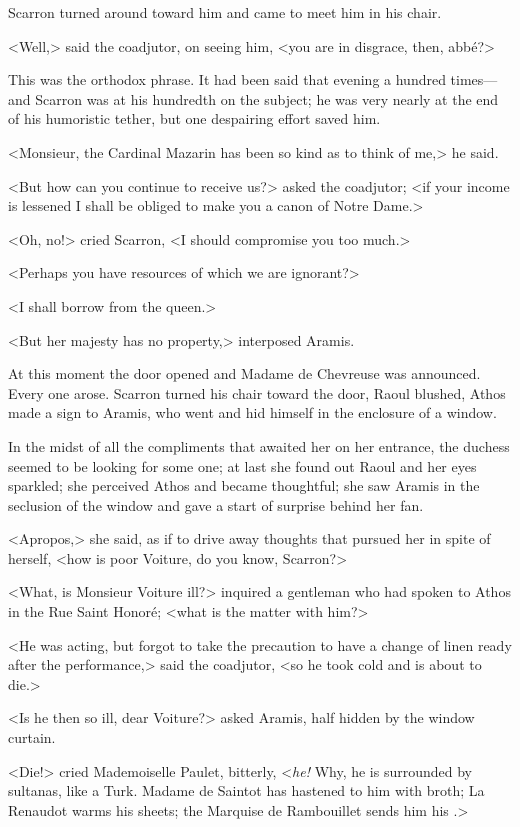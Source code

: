 Scarron turned around toward him and came to meet him in his chair.

<Well,> said the coadjutor, on seeing him, <you are in disgrace, then, abbé?>

This was the orthodox phrase. It had been said that evening a hundred times—and Scarron was at his hundredth  on the subject; he was very nearly at the end of his humoristic tether, but one despairing effort saved him.

<Monsieur, the Cardinal Mazarin has been so kind as to think of me,> he said.

<But how can you continue to receive us?> asked the coadjutor; <if your income is lessened I shall be obliged to make you a canon of Notre Dame.>

<Oh, no!> cried Scarron, <I should compromise you too much.>

<Perhaps you have resources of which we are ignorant?>

<I shall borrow from the queen.>

<But her majesty has no property,> interposed Aramis.

At this moment the door opened and Madame de Chevreuse was announced. Every one arose. Scarron turned his chair toward the door, Raoul blushed, Athos made a sign to Aramis, who went and hid himself in the enclosure of a window.

In the midst of all the compliments that awaited her on her entrance, the duchess seemed to be looking for some one; at last she found out Raoul and her eyes sparkled; she perceived Athos and became thoughtful; she saw Aramis in the seclusion of the window and gave a start of surprise behind her fan.

<Apropos,> she said, as if to drive away thoughts that pursued her in spite of herself, <how is poor Voiture, do you know, Scarron?>

<What, is Monsieur Voiture ill?> inquired a gentleman who had spoken to Athos in the Rue Saint Honoré; <what is the matter with him?>

<He was acting, but forgot to take the precaution to have a change of linen ready after the performance,> said the coadjutor, <so he took cold and is about to die.>

<Is he then so ill, dear Voiture?> asked Aramis, half hidden by the window curtain.

<Die!> cried Mademoiselle Paulet, bitterly, <\emph{he!} Why, he is surrounded by sultanas, like a Turk. Madame de Saintot has hastened to him with broth; La Renaudot warms his sheets; the Marquise de Rambouillet sends him his .>

